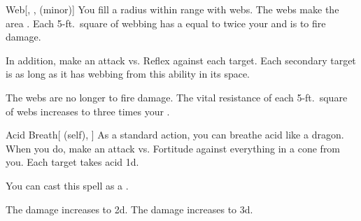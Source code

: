 \lowercase{\hypertarget{spell:Web}{}}\label{spell:Web}
\begin{freeability}[Rank 3]{\hypertarget{spell:Web}{Web}}[, ,  (minor)]
You fill a \areasmall radius  within \rngmed range with webs.
The webs make the area .
Each 5-ft.\ square of webbing has a  equal to twice your  and is  to fire damage.

In addition, make an attack vs. Reflex against each target.
\hit Each secondary target is  as long as it has webbing from this ability in its space.

\rankline
{} The webs are no longer  to fire damage.
 The vital resistance of each 5-ft.\ square of webs increases to three times your .
\end{freeability}
\vspace{0.25em}



\lowercase{\hypertarget{spell:Acid Breath}{}}\label{spell:Acid Breath}
\begin{attuneability}[Rank 4]{\hypertarget{spell:Acid Breath}{Acid Breath}}[ (self), ]
As a standard action, you can breathe acid like a dragon.
When you do, make an attack vs. Fortitude against everything in a \arealarge cone from you.
\hit Each target takes acid  \plus1d.

You can cast this spell as a .

\rankline
{} The damage increases to  \plus2d.
 The damage increases to  \plus3d.
\end{attuneability}
\vspace{0.25em}



